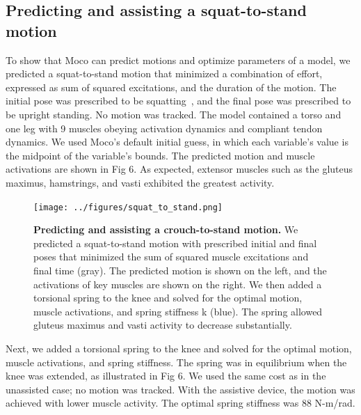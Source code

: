 \documentclass[10pt,letterpaper]{article}
\begin{document}
\subsection*{Predicting and assisting a squat-to-stand motion}

To show that Moco can predict motions and optimize parameters of a model, we predicted a squat-to-stand motion that minimized a combination of effort, expressed as sum of squared excitations, and the duration of the motion. The initial pose was prescribed to be squatting~\cite{Fregly:2015}, and the final pose was prescribed to be upright standing. No motion was tracked. The model contained a torso and one leg with 9 muscles obeying activation dynamics and compliant tendon dynamics. We used Moco’s default initial guess, in which each variable’s value is the midpoint of the variable’s bounds. The predicted motion and muscle activations are shown in Fig 6. As expected, extensor muscles such as the gluteus maximus, hamstrings, and vasti exhibited the greatest activity.

\begin{figure}[!h]
    \begin{adjustwidth}{-2.25in}{0in} %
        \centering
        \texttt{[image: ../figures/squat\_to\_stand.png]}
        \caption{{\bf Predicting and assisting a crouch-to-stand motion.}
We predicted a squat-to-stand motion with prescribed initial and final poses that minimized the sum of squared muscle excitations and final time (gray). The predicted motion is shown on the left, and the activations of key muscles are shown on the right. We then added a torsional spring to the knee and solved for the optimal motion, muscle activations, and spring stiffness k (blue). The spring allowed gluteus maximus and vasti activity to decrease substantially.
        }
        \label{squattotstand}
    \end{adjustwidth}
\end{figure}

Next, we added a torsional spring to the knee and solved for the optimal motion, muscle activations, and spring stiffness. The spring was in equilibrium when the knee was extended, as illustrated in Fig 6. We used the same cost as in the unassisted case; no motion was tracked. With the assistive device, the motion was achieved with lower muscle activity. The optimal spring stiffness was 88 N-m/rad.
\end{document}

